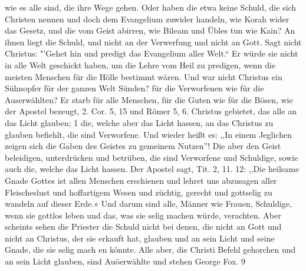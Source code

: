 wie es alle sind, die ihre Wege gehen. Oder haben die etwa
keine Schuld, die sich Christen nennen und doch dem Evangelium
zuwider handeln, wie Korah wider das Gesetz, und die vom
Geist abirren, wie Bileam und Übles tun wie Kain? An ihnen
liegt die Schuld, und nicht an der Verwerfung und nicht an Gott.
Sagt nicht Christus: "'Gehet hin und predigt das Evangelium
aller Welt."` Er würde sie nicht in alle Welt geschickt haben, um
die Lehre vom Heil zu predigen, wenn die meisten Menschen für
die Hölle bestimmt wären. Und war nicht Christus ein Sühnopfer 
für der ganzen Welt Sünden? für die Verworfenen wie für
die Auserwählten? Er starb für alle Menschen, für die Guten
wie für die Bösen, wie der Apostel bezeugt, 2. Cor. 5, 15 und
Römer 5, 6.  Christus gebietet, das alle an das Licht glauben; 1
die, welche aber das Licht hassen, an das Christus zu glauben
befiehlt, die sind Verworfene. Und wieder heißt es: ,,In einem
Jeglichen zeigen sich die Gaben des Geistes zu gemeinem Nutzen"'!
Die aber den Geist beleidigen, unterdrücken und betrüben, die
sind Verworfene und Schuldige, sowie auch die, welche das Licht
hassen. Der Apostel sagt, Tit. 2, 11. 12: ,,Die heilsame Gnade
Gottes ist allen Menschen erschienen und lehret uns abzusagen
aller Fleischeslust und hoffartigem Wesen und züchtig, gerecht und
gottselig zu wandeln auf dieser Erde.« Und darum sind alle,
Männer wie Frauen, Schuldige, wenn sie gottlos leben und das,
was sie selig machen würde, verachten. Aber scheints sehen die
Priester die Schuld nicht bei denen, die nicht an Gott und nicht
an Christus, der sie erkauft hat, glauben und an sein Licht und
seine Gnade, die sie selig mach en könnte. Alle aber, die Christi Befehl
gehorchen und an sein Licht glauben, sind Auöerwählte und stehen
George Fox. 9

